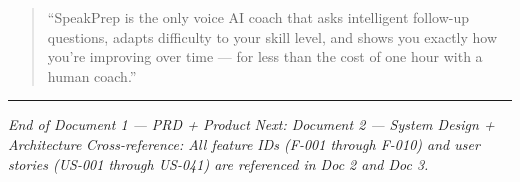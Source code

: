 \documentclass[
  11pt,
]{article}
\begin{document}
\begin{quote}
``SpeakPrep is the only voice AI coach that asks intelligent follow-up
questions, adapts difficulty to your skill level, and shows you exactly
how you're improving over time --- for less than the cost of one hour
with a human coach.''
\end{quote}

\begin{center}\rule{0.5\linewidth}{0.5pt}\end{center}

\emph{End of Document 1 --- PRD + Product} \emph{Next: Document 2 ---
System Design + Architecture} \emph{Cross-reference: All feature IDs
(F-001 through F-010) and user stories (US-001 through US-041) are
referenced in Doc 2 and Doc 3.}
\end{document}
